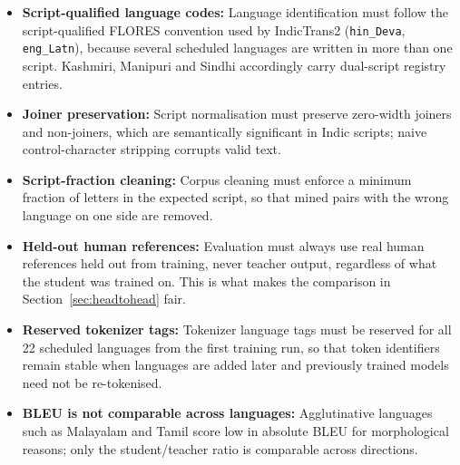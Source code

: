 \begin{itemize}
  \item \textbf{Script-qualified language codes:} Language identification must follow the script-qualified
        FLORES convention used by IndicTrans2 (\texttt{hin\_Deva},
        \texttt{eng\_Latn}), because several scheduled languages are written in
        more than one script. Kashmiri, Manipuri and Sindhi accordingly carry
        dual-script registry entries.
  \item \textbf{Joiner preservation:} Script normalisation must preserve zero-width joiners and
        non-joiners, which are semantically significant in Indic scripts; naive
        control-character stripping corrupts valid text.
  \item \textbf{Script-fraction cleaning:} Corpus cleaning must enforce a minimum fraction of
        letters in the expected script, so that mined pairs with the wrong
        language on one side are removed.
  \item \textbf{Held-out human references:} Evaluation must always use real human references held out
        from training, never teacher output, regardless of what the student was
        trained on. This is what makes the comparison in
        Section~\ref{sec:headtohead} fair.
  \item \textbf{Reserved tokenizer tags:} Tokenizer language tags must be reserved for all 22
        scheduled languages from the first training run, so that token
        identifiers remain stable when languages are added later and previously
        trained models need not be re-tokenised.
  \item \textbf{BLEU is not comparable across languages:} Agglutinative
        languages such as Malayalam and Tamil score low in absolute BLEU for
        morphological reasons; only the student/teacher ratio is comparable
        across directions.
\end{itemize}
